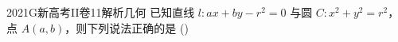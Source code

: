 
\begin{problem}{2021}{G}{新高考II卷}{11}{解析几何}
已知直线 $ l:ax+by-r^2=0 $ 与圆 $ C:x^2+y^2=r^2 $，点 $ A(a,b) $，则下列说法正确的是 (\hspace{1cm})

\begin{choices}
\end{choices}
\end{problem}

\begin{answer}

\end{answer}

\begin{solutions}

\end{solutions}
